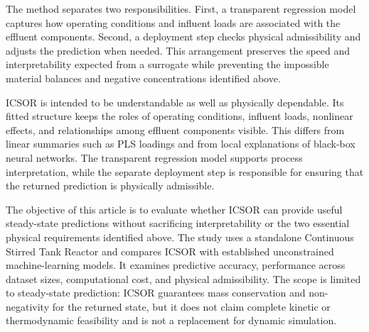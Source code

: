 \documentclass[a4paper,fleqn]{cas-sc}
\DeclareRobustCommand{\currentrev}[1]{{\color{currentRevisionBlue}#1}}
\newenvironment{currentrevblock}{\begingroup\color{currentRevisionBlue}}{\endgroup}
\DeclareRobustCommand{\currentrev}[1]{#1}
\newenvironment{currentrevblock}{}{}
\newcommand{\revitem}[2]{#2}
\newenvironment{revblock}{}{}
\begin{document}
\begin{revblock}
\begin{currentrevblock}
The method separates two responsibilities. First, a transparent regression model captures how operating conditions and influent loads are associated with the effluent components. Second, a deployment step checks physical admissibility and adjusts the prediction when needed. This arrangement preserves the speed and interpretability expected from a surrogate while preventing the impossible material balances and negative concentrations identified above.
\end{currentrevblock}

\revitem{revRtwoOne}{\currentrev{ICSOR is intended to be understandable as well as physically dependable. Its fitted structure keeps the roles of operating conditions, influent loads, nonlinear effects, and relationships among effluent components visible. This differs from linear summaries such as PLS loadings and from local explanations of black-box neural networks. The transparent regression model supports process interpretation, while the separate deployment step is responsible for ensuring that the returned prediction is physically admissible.}}

\begin{currentrevblock}
The objective of this article is to evaluate whether ICSOR can provide useful steady-state predictions without sacrificing interpretability or the two essential physical requirements identified above. The study uses a standalone Continuous Stirred Tank Reactor and compares ICSOR with established unconstrained machine-learning models. It examines predictive accuracy, performance across dataset sizes, computational cost, and physical admissibility. The scope is limited to steady-state prediction: ICSOR guarantees mass conservation and non-negativity for the returned state, but it does not claim complete kinetic or thermodynamic feasibility and is not a replacement for dynamic simulation.
\end{currentrevblock}
\end{revblock}
\end{document}

